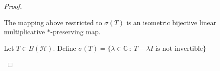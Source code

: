 \begin{proof}
  \begin{corollary}
    The mapping above restricted to $\sigma(T)$ is an isometric
    bijective linear multiplicative $*$-preserving map.
  \end{corollary}

  \begin{definition}
    Let $T \in B(\mathcal{H})$. Define $\sigma(T) = \{ \lambda \in
    \mathbb{C}  \ : \   T - \lambda I \textrm{ is not invertible} \}$
  \end{definition}
\end{proof}


